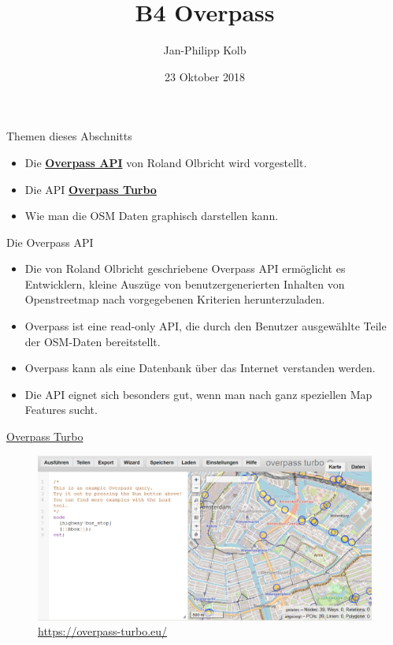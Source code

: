 \documentclass[ignorenonframetext,]{beamer}
\title{B4 Overpass}
\author{Jan-Philipp Kolb}
\date{23 Oktober 2018}
\providecommand{\tightlist}{%
  \setlength{\itemsep}{0pt}\setlength{\parskip}{0pt}}
\begin{document}
\frame{\titlepage}

\begin{frame}{Themen dieses Abschnitts}
\protect\hypertarget{themen-dieses-abschnitts}{}

\begin{itemize}
\tightlist
\item
  Die
  \href{https://wiki.openstreetmap.org/wiki/Overpass_API}{\textbf{Overpass
  API}} von Roland Olbricht wird vorgestellt.
\item
  Die API \href{https://overpass-turbo.eu/}{\textbf{Overpass Turbo}}
\item
  Wie man die OSM Daten graphisch darstellen kann.
\end{itemize}

\end{frame}

\begin{frame}{Die Overpass API}
\protect\hypertarget{die-overpass-api}{}

\begin{itemize}
\tightlist
\item
  Die von Roland Olbricht geschriebene Overpass API ermöglicht es
  Entwicklern, kleine Auszüge von benutzergenerierten Inhalten von
  Openstreetmap nach vorgegebenen Kriterien herunterzuladen.
\item
  Overpass ist eine read-only API, die durch den Benutzer ausgewählte
  Teile der OSM-Daten bereitstellt.
\item
  Overpass kann als eine Datenbank über das Internet verstanden werden.
\item
  Die API eignet sich besonders gut, wenn man nach ganz speziellen Map
  Features sucht.
\end{itemize}

\end{frame}

\begin{frame}{\href{https://overpass-turbo.eu/}{Overpass Turbo}}
\protect\hypertarget{overpass-turbo}{}

\begin{figure}
\centering
\includegraphics{figure/overpassTurbo.PNG}
\caption{\url{https://overpass-turbo.eu/}}
\end{figure}

\end{frame}
\end{document}
